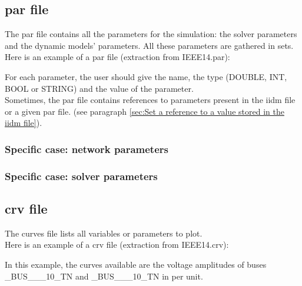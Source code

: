 \documentclass[a4paper, 12pt]{report}
\begin{document}
\subsection{par file}
\label{DynawoInputFiles_inputs_par}

The par file contains all the parameters for the simulation: the solver parameters and the dynamic models' parameters. All these parameters are gathered in sets. \\

Here is an example of a par file (extraction from IEEE14.par):


For each parameter, the user should give the name, the type (DOUBLE, INT, BOOL or STRING) and the value of the parameter. \\

Sometimes, the par file contains references to parameters present in the iidm file or a given par file. (see paragraph \ref{sec:Set a reference to a value stored in the iidm file}).

\subsubsection{Specific case: network parameters}
\label{DynawoInputFiles_inputs_par_network}

\subsubsection{Specific case: solver parameters}
\label{DynawoInputFiles_inputs_par_solver}

\subsection{crv file}

The curves file lists all variables or parameters to plot. \\

Here is an example of a crv file (extraction from IEEE14.crv):


In this example, the curves available are the voltage amplitudes of buses \_BUS\_\_\_10\_TN and \_BUS\_\_\_10\_TN in per unit.
\end{document}
